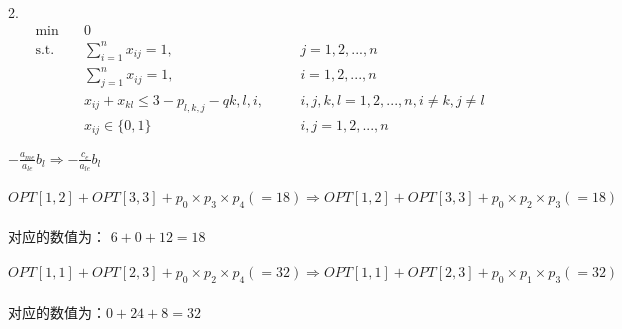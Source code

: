 \documentclass[11pt]{article}
\begin{document}
\begin{CJK*}{GBK}{song}
\paragraph{}
2.
\begin{alignat*}{2}
\min\quad & 0 &{}& \tag{LP3} \label{eqn - lp}\\
\mbox{s.t.}\quad
 & \sum^{n}_{i=1}x_{ij}  = 1, &\quad& j = 1,2,...,n\\
 & \sum^{n}_{j=1}x_{ij}  = 1, &\quad& i = 1,2,...,n\\
 & x_{ij} + x_{kl} \leq 3-p_{l,k,j}-q{k,l,i}, &\quad& i,j,k,l = 1,2,...,n, i \neq k, j \neq l\\
 & x_{ij} \in \{0,1\} &{}& i,j = 1,2,...,n           %
\end{alignat*}

$-\frac{a_{me}}{a_{le}}b_l \Longrightarrow -\frac{c_{e}}{a_{le}}b_l$

\paragraph{}
$OPT[1,2] + OPT[3,3] + p_0 \times p_3 \times p_4 (=18)\Longrightarrow OPT[1,2] + OPT[3,3] + p_0 \times p_2 \times p_3 (=18)$
\paragraph{}
对应的数值为： $6 + 0 + 12 = 18$

\paragraph{}
$OPT[1,1] + OPT[2,3] + p_0 \times p_2 \times p_4 (=32)\Longrightarrow OPT[1,1] + OPT[2,3] + p_0 \times p_1 \times p_3 (=32)$
\paragraph{}
对应的数值为：$0 + 24 + 8 = 32$

\end{CJK*}
\end{document}
